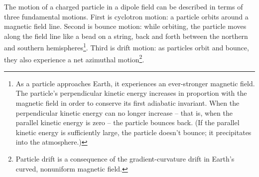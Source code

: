 








The motion of a charged particle in a dipole field can be described in terms of three fundamental motions. First is cyclotron motion: a particle orbits around a magnetic field line. Second is bounce motion: while orbiting, the particle moves along the field line like a bead on a string, back and forth between the northern and southern hemispheres\footnote{As a particle approaches Earth, it experiences an ever-stronger magnetic field. The particle's perpendicular kinetic energy increases in proportion with the magnetic field in order to conserve its first adiabatic invariant. When the perpendicular kinetic energy can no longer increase -- that is, when the parallel kinetic energy is zero -- the particle bounces back. (If the parallel kinetic energy is sufficiently large, the particle doesn't bounce; it precipitates into the atmosphere.)}. Third is drift motion: as particles orbit and bounce, they also experience a net azimuthal motion\footnote{Particle drift is a consequence of the gradient-curvature drift in Earth's curved, nonuniform magnetic field.}. 



